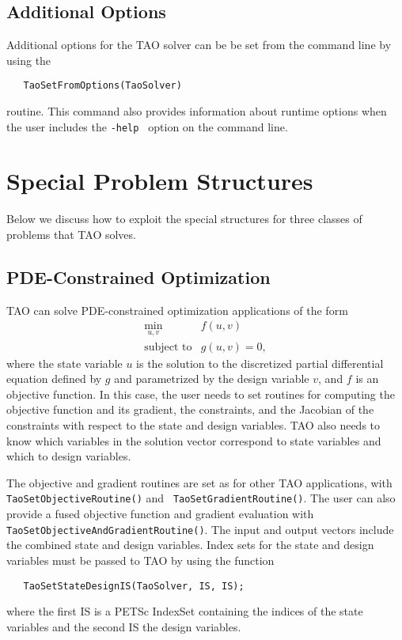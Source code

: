 \subsection{Additional Options}
Additional options for the TAO solver 
can be be set from the command line by using the  
\begin{verbatim}
   TaoSetFromOptions(TaoSolver)
\end{verbatim}
routine. 
This command also provides information about runtime options when the
user includes the {\tt -help } option on the command line.

\section{Special Problem Structures}
Below we discuss how to exploit the special structures for three classes
of problems that TAO solves. 

\subsection{PDE-Constrained Optimization}\label{sec:pde_applications}
TAO can solve PDE-constrained optimization applications 
of the form
\[
\begin{array}{ll}
\displaystyle \min_{u,v} & f(u,v) \\
\mbox{subject to} & g(u,v) = 0,
\end{array}
\]
where the state variable $u$ is the solution to the discretized partial 
differential equation defined by $g$ and parametrized by the design 
variable $v$, and $f$ is an objective function.  In this case, the 
user needs to set routines for computing the objective function
and its gradient, the constraints, and the Jacobian of the constraints
with respect to the state and design variables.  TAO also needs to know 
which variables in the solution vector correspond to state variables 
and which to design variables.

The objective and gradient routines are set as for other TAO applications,
with {\tt Tao\-Set\-Object\-ive\-Routine()} and {\tt
Tao\-Set\-Gradient\-Routine()}.  The user can also provide a fused
objective function and gradient
evaluation with {\tt Tao\-Set\-Objective\-And\-Gradient\-Routine()}.
The input and output vectors include the combined state and design 
variables.  Index sets for the state and design variables must be 
passed to TAO by using the function
\begin{verbatim}
   TaoSetStateDesignIS(TaoSolver, IS, IS);
\end{verbatim}
where the first IS is a PETSc Index\-Set containing the indices of the
state variables and the second IS the design variables.

